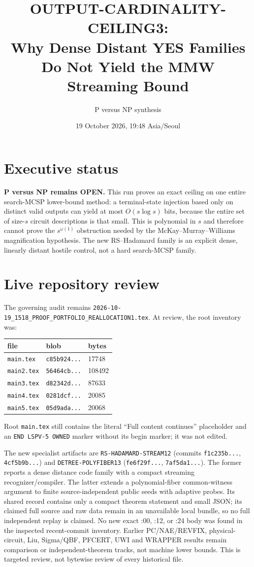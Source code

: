 \documentclass[11pt]{article}
\title{OUTPUT-CARDINALITY-CEILING3:\\Why Dense Distant YES Families Do Not Yield the MMW Streaming Bound}
\author{P versus NP synthesis}
\date{19 October 2026, 19:48 Asia/Seoul}
\begin{document}
\maketitle

\section*{Executive status}
\textbf{P versus NP remains OPEN.}  This run proves an exact ceiling on one
entire search-MCSP lower-bound method: a terminal-state injection based only
on distinct valid outputs can yield at most $O(s\log s)$ bits, because the
entire set of size-$s$ circuit descriptions is that small.  This is
polynomial in $s$ and therefore cannot prove the $s^{\omega(1)}$ obstruction
needed by the McKay--Murray--Williams magnification hypothesis.  The new
RS--Hadamard family is an explicit dense, linearly distant hostile control,
not a hard search-MCSP family.

\section*{Live repository review}
The governing audit remains
\texttt{2026-10-19\_1518\_PROOF\_PORTFOLIO\_REALLOCATION1.tex}.  At review,
the root inventory was:
\begin{center}
\begin{tabular}{lll}
\toprule
file & blob & bytes\\
\midrule
\texttt{main.tex} & \texttt{c85b924...} & 17748\\
\texttt{main2.tex} & \texttt{56464cb...} & 108492\\
\texttt{main3.tex} & \texttt{d82342d...} & 87633\\
\texttt{main4.tex} & \texttt{0281dcf...} & 20085\\
\texttt{main5.tex} & \texttt{05d9ada...} & 20068\\
\bottomrule
\end{tabular}
\end{center}
Root \texttt{main.tex} still contains the literal ``Full content continues''
placeholder and an \texttt{END LSPV-5 OWNED} marker without its begin marker;
it was not edited.

The new specialist artifacts are \texttt{RS-HADAMARD-STREAM12}
(commits \texttt{f1c235b...}, \texttt{4cf5b9b...}) and
\texttt{DETREE-POLYFIBER13} (\texttt{fe6f29f...}, \texttt{7af5da1...}).
The former reports a dense distance code family with a compact streaming
recognizer/compiler.  The latter extends a polynomial-fiber common-witness
argument to finite source-independent public seeds with adaptive probes.  Its
shared record contains only a compact theorem statement and small JSON; its
claimed full source and raw data remain in an unavailable local bundle, so no
full independent replay is claimed.  No new exact :00, :12, or :24 body was
found in the inspected recent-commit inventory.  Earlier PC/NAE/REVFIX,
physical-circuit, Liu, Sigma/QBF, PFCERT, UWI and WRAPPER results remain
comparison or independent-theorem tracks, not machine lower bounds.  This is
targeted review, not bytewise review of every historical file.
\end{document}
